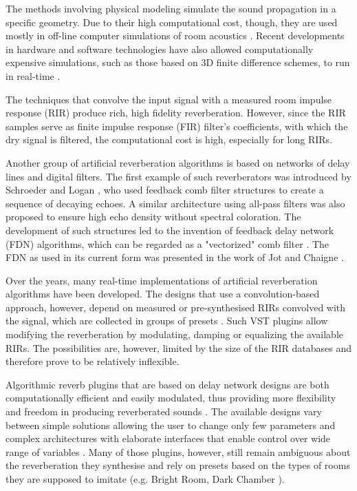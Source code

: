 \documentclass[twoside,a4paper]{article}
\begin{document}
The methods involving physical modeling simulate the sound propagation in a specific geometry. Due to their high computational cost, though, they are used mostly in off-line computer simulations of room acoustics \cite{peters2012}. 
Recent developments in hardware and software technologies have also allowed computationally expensive simulations, such as those based on 3D finite difference schemes, to run in real-time \cite{bilbao2019passive}.

The techniques that convolve the input signal with a measured room impulse response (RIR) produce rich, high fidelity reverberation. However, since the RIR samples serve as finite impulse response (FIR) filter's coefficients, with which the dry signal is filtered, the computational cost is high, especially for long RIRs. 

Another group of artificial reverberation algorithms is based on networks of delay lines and digital filters. The first example of such reverberators was introduced by Schroeder and Logan \cite{schroeder}, who used feedback comb filter structures to create a sequence of decaying echoes. A similar architecture using all-pass filters was also proposed to ensure high echo density without spectral coloration. The development of such structures led to the invention of feedback delay network (FDN) algorithms, which can be regarded as a "vectorized" comb filter \cite{Valimaki:2012}. The FDN as used in its current form was presented in the work of Jot and Chaigne \cite{Jot:Chaine:1991:aes, Jot:Chaine:1996}. 

Over the years, many real-time implementations of artificial reverberation algorithms have been developed. The designs that use a convolution-based approach, however, depend on measured or pre-synthesised RIRs convolved with the signal, which are collected in groups of presets \cite{peters2012, heise2009automatic, borss2009, ableton}. Such VST plugins allow modifying the reverberation by modulating, damping or equalizing the available RIRs. The possibilities are, however, limited by the size of the RIR databases and therefore prove to be relatively inflexible. 

Algorithmic reverb plugins that are based on delay network designs are both computationally efficient and easily modulated, thus providing more flexibility and freedom in producing reverberated sounds \cite{kereliuk2018, philbert2017developing}. The available designs vary between simple solutions allowing the user to change only few parameters \cite{moffat2019} and complex architectures with elaborate interfaces that enable control over wide range of variables \cite{erbe2015}. Many of those plugins, however, still remain ambiguous about the reverberation they synthesise and rely on presets based on the types of rooms they are supposed to imitate (e.g. Bright Room, Dark Chamber \cite{valhalla}).
\end{document}
